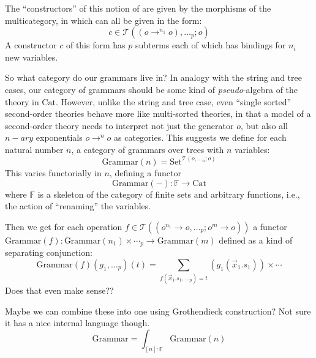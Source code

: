 \documentclass[12pt]{article}
\newcommand{\Set}{\textrm{Set}}
\newcommand{\FinSet}{\mathbb F}
\newcommand{\Cat}{\textrm{Cat}}
\newcommand{\Grammar}{\textrm{Grammar}}
\begin{document}
The ``constructors'' of this notion of are given by the morphisms of
the multicategory, in which can all be given in the form:
\[ c \in \mathcal T((o \to^{n_1} o), \ldots_{p}; o) \]
A constructor $c$ of this form has $p$ subterms each of which has
bindings for $n_i$ new variables.

So what category do our grammars live in?
%
In analogy with the string and tree cases, our category of grammars
should be some kind of \emph{pseudo}-algebra of the theory in $\Cat$.
%
However, unlike the string and tree case, even ``single sorted''
second-order theories behave more like multi-sorted theories, in that
a model of a second-order theory needs to interpret not just the
generator $o$, but also all $n-ary$ exponentials $o \to^n o$ as
categories.
%
This suggests we define for each natural number $n$, a category of
grammars over trees with $n$ variables:
\[ \Grammar(n) = \Set^{\mathcal T(o,\ldots_n;o)} \]
This varies functorially in $n$, defining a functor
\[ \Grammar(-) : \FinSet \to \Cat \]
where $\FinSet$ is a skeleton of the category of finite sets and
arbitrary functions, i.e., the action of ``renaming'' the variables.

Then we get for each operation $f \in \mathcal T((o^{n_1} \to o,
\ldots_p; o^m \to o))$ a functor $\Grammar(f) : \Grammar(n_1) \times
\cdots_p \to \Grammar(m)$ defined as a kind of separating conjunction:
\[ \Grammar(f)(g_1,\ldots_p)(t) = \sum_{f(\vec x_1. s_1,\ldots_p) = t} (g_1(\vec x_1.s_1)) \times \cdots \]
Does that even make sense??

Maybe we can combine these into one using Grothendieck construction?
Not sure it has a nice internal language though.
\[ \Grammar = \int_{[n] : \FinSet} \Grammar(n) \]



\end{document}
